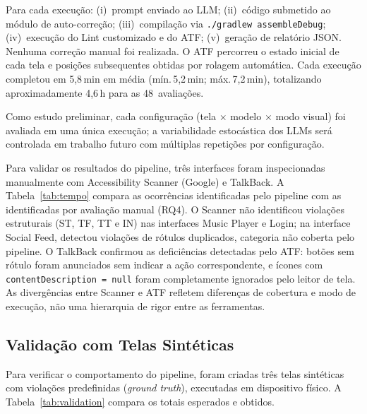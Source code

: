 \documentclass[sigconf,anonymous,review]{webmedia}
\begin{document}
Para cada execução: (i)~prompt enviado ao LLM; (ii)~código submetido
ao módulo de auto-correção; (iii)~compilação via
\texttt{./gradlew assembleDebug}; (iv)~execução do Lint customizado e
do ATF; (v)~geração de relatório JSON. Nenhuma correção manual foi
realizada. O ATF percorreu o estado inicial de cada tela e posições
subsequentes obtidas por rolagem automática. Cada execução completou
em 5,8\,min em média (mín.\,5,2\,min; máx.\,7,2\,min), totalizando
aproximadamente 4,6\,h para as 48~avaliações.

Como estudo preliminar, cada configuração (tela $\times$ modelo
$\times$ modo visual) foi avaliada em uma única execução; a
variabilidade estocástica dos LLMs será controlada em trabalho futuro
com múltiplas repetições por configuração.

Para validar os resultados do pipeline, três interfaces foram
inspecionadas manualmente com Accessibility Scanner (Google) e TalkBack.
A Tabela~\ref{tab:tempo} compara as ocorrências identificadas pelo
pipeline com as identificadas por avaliação manual (RQ4). O Scanner não
identificou violações estruturais (ST, TF, TT e IN) nas interfaces Music
Player e Login; na interface Social Feed, detectou violações de rótulos
duplicados, categoria não coberta pelo pipeline. O TalkBack confirmou as
deficiências detectadas pelo ATF: botões sem rótulo foram anunciados sem
indicar a ação correspondente, e ícones com
\texttt{contentDescription\,=\,null} foram completamente ignorados pelo
leitor de tela. As divergências entre Scanner e ATF refletem diferenças
de cobertura e modo de execução, não uma hierarquia de rigor entre as
ferramentas.

\subsection{Validação com Telas Sintéticas}
\label{sec:validacao}

Para verificar o comportamento do pipeline, foram criadas três telas
sintéticas com violações predefinidas (\textit{ground truth}),
executadas em dispositivo físico. A Tabela~\ref{tab:validation}
compara os totais esperados e obtidos.
\end{document}
